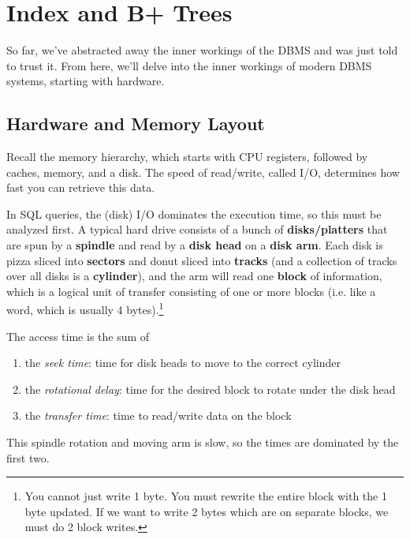 \section{Index and B+ Trees} 

  So far, we've abstracted away the inner workings of the DBMS and was just told to trust it. From here, we'll delve into the inner workings of modern DBMS systems, starting with hardware.   

\subsection{Hardware and Memory Layout}

  Recall the memory hierarchy, which starts with CPU registers, followed by caches, memory, and a disk. The speed of read/write, called I/O, determines how fast you can retrieve this data. 

  \begin{definition}
    In SQL queries, the (disk) I/O dominates the execution time, so this must be analyzed first. A typical hard drive consists of a bunch of \textbf{disks/platters} that are spun by a \textbf{spindle} and read by a \textbf{disk head} on a \textbf{disk arm}. Each disk is pizza sliced into \textbf{sectors} and donut sliced into \textbf{tracks} (and a collection of tracks over all disks is a \textbf{cylinder}), and the arm will read one \textbf{block} of information, which is a logical unit of transfer consisting of one or more blocks (i.e. like a word, which is usually 4 bytes).\footnote{You cannot just write 1 byte. You must rewrite the entire block with the 1 byte updated. If we want to write 2 bytes which are on separate blocks, we must do 2 block writes.} 
  \end{definition}

  \begin{definition}
    The access time is the sum of 
    \begin{enumerate}
      \item the \textit{seek time}: time for disk heads to move to the correct cylinder 
      \item the \textit{rotational delay}: time for the desired block to rotate under the disk head 
      \item the \textit{transfer time}: time to read/write data on the block
    \end{enumerate}
    This spindle rotation and moving arm is slow, so the times are dominated by the first two. 
  \end{definition}

